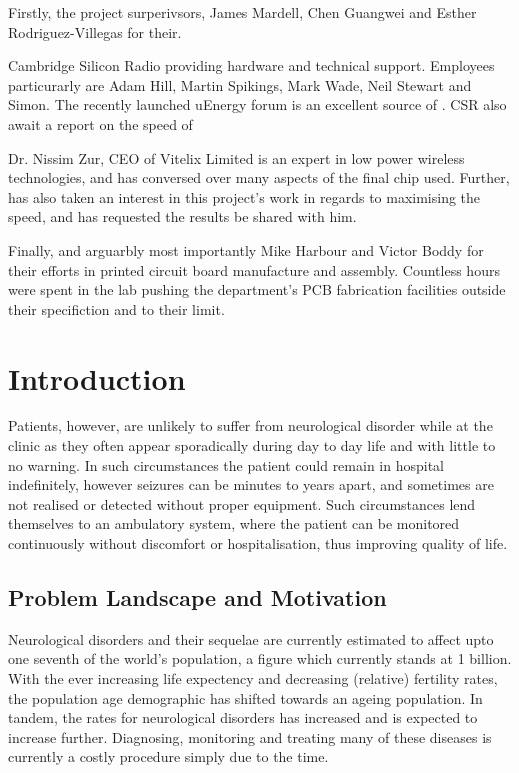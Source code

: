 \documentclass[]{article}
\begin{document}
Firstly, the project surperivsors, James Mardell, Chen Guangwei and Esther Rodriguez-Villegas for their. 

Cambridge Silicon Radio providing hardware and technical support. Employees particurarly are Adam Hill, Martin Spikings, Mark Wade, Neil Stewart and Simon. The recently launched uEnergy forum is an excellent source of . CSR also await a report on the speed of 

Dr. Nissim Zur, CEO of Vitelix Limited is an expert in low power wireless technologies, and has conversed over many aspects of the final chip used. Further, has also taken an interest in this project's work in regards to maximising the speed, and has requested the results be shared with him.

Finally, and arguarbly most importantly Mike Harbour and Victor Boddy for their efforts in printed circuit board manufacture and assembly. Countless hours were spent in the lab pushing the department's PCB fabrication facilities outside their specifiction and to their limit. 

\clearpage

\section{Introduction}
Patients, however, are unlikely to suffer from neurological disorder while at the clinic as they often appear sporadically during day to day life and with little to no warning. In such circumstances the patient could remain in hospital indefinitely, however seizures can be minutes to years apart, and sometimes are not realised or detected without proper equipment. Such circumstances lend themselves to an ambulatory system, where the patient can be monitored continuously without discomfort or hospitalisation, thus improving quality of life. 



\subsection{Problem Landscape and Motivation}
Neurological disorders and their sequelae are currently estimated to affect upto one seventh of the world's population, a figure which currently stands at 1 billion. With the ever increasing life expectency and decreasing (relative) fertility rates, the population age demographic has shifted towards an ageing population. In tandem, the rates for neurological disorders has increased and is expected to increase further. Diagnosing, monitoring and treating many of these diseases is currently a costly procedure simply due to the time. 
\end{document}
